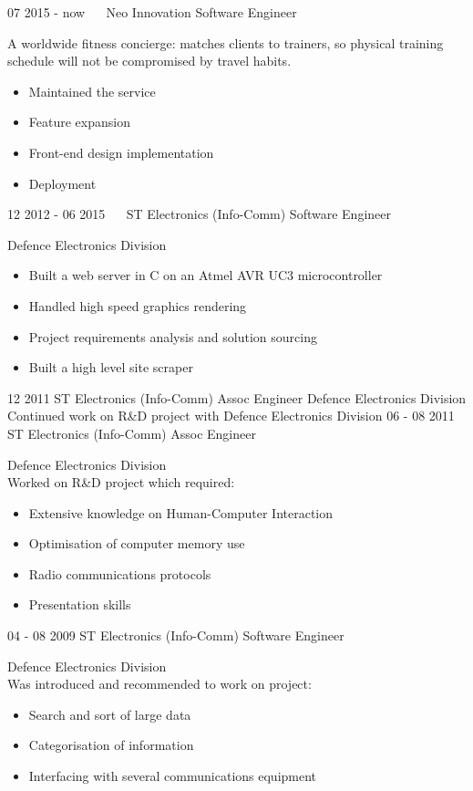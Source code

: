 \documentclass[]{friggeri-cv}
\begin{document}
\begin{entrylist}
	\entry
	{07 2015 - now   \ \ }
	{Neo Innovation}
	{Software Engineer}
	{A worldwide fitness concierge: matches clients to trainers, so physical training schedule will not be compromised by travel habits.
	\begin{itemize}[itemsep=0pt,topsep=0pt]
	\item Maintained the service
	\item Feature expansion
	\item Front-end design implementation
	\item Deployment
	\end{itemize}}
	\entry
	{12 2012 - 06 2015   \ \ }
	{ST Electronics (Info-Comm)}
	{Software Engineer}
	{Defence Electronics Division
	\begin{itemize}[itemsep=0pt,topsep=0pt]
	\item Built a web server in C on an Atmel AVR UC3 microcontroller
	\item Handled high speed graphics rendering
	\item Project requirements analysis and solution sourcing
	\item Built a high level site scraper
	\end{itemize}}
	\entry
	{12 2011 }
	{ST Electronics (Info-Comm)}
	{Assoc Engineer}
	{Defence Electronics Division \\ Continued work on R\&D project with Defence Electronics Division}{}
	\entry
	{06 - 08 2011 }
	{ST Electronics (Info-Comm)}
	{Assoc Engineer}
	{Defence Electronics Division \\Worked on R\&D project which required:
	\begin{itemize}[itemsep=0pt,topsep=0pt]
	\item Extensive knowledge on Human-Computer Interaction
	\item Optimisation of computer memory use
	\item Radio communications protocols
	\item Presentation skills
	\end{itemize}}
	\entry
	{04 - 08 2009}
	{ST Electronics (Info-Comm)}
	{Software Engineer}
	{Defence Electronics Division \\Was introduced and recommended to work on project:
	\begin{itemize}[itemsep=0pt,topsep=0pt]
	\item Search and sort of large data
	\item Categorisation of information
	\item Interfacing with several communications equipment
	\end{itemize}}
\end{entrylist}
\end{document}
